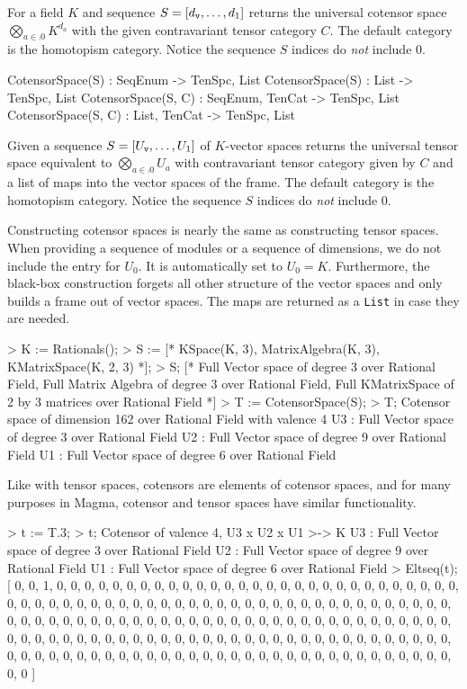 For a field $K$ and sequence $S=[d_{\operatorname{\mathtt{v}}},\dots, d_1]$ returns the universal cotensor 
space $\bigotimes_{a\in\comp{0}}K^{d_a}$ with the given contravariant tensor category $C$.
The default category is the homotopism category.
Notice the sequence $S$ indices do \emph{not} include 0.

\begin{intrinsics}
CotensorSpace(S) : SeqEnum -> TenSpc, List
CotensorSpace(S) : List -> TenSpc, List
CotensorSpace(S, C) : SeqEnum, TenCat -> TenSpc, List
CotensorSpace(S, C) : List, TenCat -> TenSpc, List
\end{intrinsics}

Given a sequence $S=[U_{\operatorname{\mathtt{v}}},\dots, U_1]$ of $K$-vector spaces returns the universal tensor 
space equivalent to $\bigotimes_{a\in\comp{0}}U_a$ with contravariant tensor 
category given by $C$ and a list of maps into the vector spaces of the frame. 
The default category is the homotopism category.
Notice the sequence $S$ indices do \emph{not} include 0.

\begin{example}[UniversalCoTenSpc]

Constructing cotensor spaces is nearly the same as constructing tensor spaces.
When providing a sequence of modules or a sequence of dimensions, we do not
include the entry for $U_0$. It is automatically set to $U_0=K$. Furthermore,
the black-box construction forgets all other structure of the vector spaces and
only builds a frame out of vector spaces. The maps are returned as a
\texttt{List} in case they are needed.
\begin{code}
> K := Rationals();
> S := [* KSpace(K, 3), MatrixAlgebra(K, 3), KMatrixSpace(K, 2, 3) *];
> S;
[*
    Full Vector space of degree 3 over Rational Field,
    Full Matrix Algebra of degree 3 over Rational Field,
    Full KMatrixSpace of 2 by 3 matrices over Rational Field
*]
> T := CotensorSpace(S);
> T;
Cotensor space of dimension 162 over Rational Field with valence 4
U3 : Full Vector space of degree 3 over Rational Field
U2 : Full Vector space of degree 9 over Rational Field
U1 : Full Vector space of degree 6 over Rational Field
\end{code}

Like with tensor spaces, cotensors are elements of cotensor spaces, and for many
purposes in Magma, cotensor and tensor spaces have similar functionality. 
\begin{code}
> t := T.3;
> t;
Cotensor of valence 4, U3 x U2 x U1 >-> K
U3 : Full Vector space of degree 3 over Rational Field
U2 : Full Vector space of degree 9 over Rational Field
U1 : Full Vector space of degree 6 over Rational Field
> Eltseq(t);
[ 0, 0, 1, 0, 0, 0, 0, 0, 0, 0, 0, 0, 0, 0, 0, 0, 0, 0, 0, 0, 0, 0, 0, 0, 0,
0, 0, 0, 0, 0, 0, 0, 0, 0, 0, 0, 0, 0, 0, 0, 0, 0, 0, 0, 0, 0, 0, 0, 0, 0, 0,
0, 0, 0, 0, 0, 0, 0, 0, 0, 0, 0, 0, 0, 0, 0, 0, 0, 0, 0, 0, 0, 0, 0, 0, 0, 0,
0, 0, 0, 0, 0, 0, 0, 0, 0, 0, 0, 0, 0, 0, 0, 0, 0, 0, 0, 0, 0, 0, 0, 0, 0, 0,
0, 0, 0, 0, 0, 0, 0, 0, 0, 0, 0, 0, 0, 0, 0, 0, 0, 0, 0, 0, 0, 0, 0, 0, 0, 0,
0, 0, 0, 0, 0, 0, 0, 0, 0, 0, 0, 0, 0, 0, 0, 0, 0, 0, 0, 0, 0, 0, 0, 0, 0, 0,
0, 0, 0, 0, 0, 0, 0 ]
\end{code}
\end{example}

